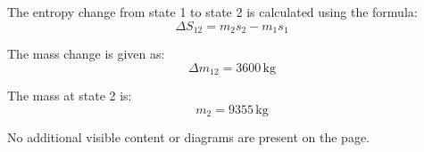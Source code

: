 The entropy change from state 1 to state 2 is calculated using the formula:  
\[
\Delta S_{12} = m_2 s_2 - m_1 s_1
\]  

The mass change is given as:  
\[
\Delta m_{12} = 3600 \, \text{kg}
\]  

The mass at state 2 is:  
\[
m_2 = 9355 \, \text{kg}
\]  

No additional visible content or diagrams are present on the page.